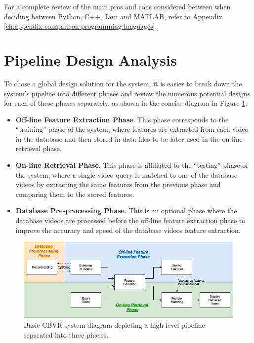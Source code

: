 For a complete review of the main pros and cons considered between when deciding between Python, C++, Java and MATLAB, refer to Appendix \ref{ch:appendix-comparison-programming-languages}.


\section{Pipeline Design Analysis}

To chose a global design solution for the system, it is easier to break down the system’s pipeline into different phases and review the numerous potential designs for each of these phases separately, as shown in the concise diagram in Figure \ref{fig:basic-cbvr-diagram}:

\begin{itemize}
    \item \textbf{Off-line Feature Extraction Phase}. This phase corresponds to the ``training'' phase of the system, where features are extracted from each video in the database and then stored in data files to be later used in the on-line retrieval phase.
    \item \textbf{On-line Retrieval Phase}. This phase is affiliated to the ``testing'' phase of the system, where a single video query is matched to one of the database videos by extracting the same features from the previous phase and comparing them to the stored features.
    \item \textbf{Database Pre-processing Phase}. This is an optional phase where the database videos are processed before the off-line feature extraction phase to improve the accuracy and speed of the database videos feature extraction.
\end{itemize}

\begin{figure}[h]
\centerline{\includegraphics[width=1.1\textwidth]{figures/design/basic_cbvr_phases.png}}
\caption{\label{fig:basic-cbvr-diagram}Basic CBVR system diagram depicting a high-level pipeline separated into three phases.}
\end{figure}

